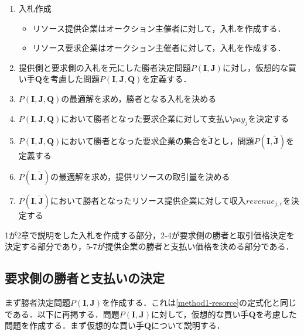 \begin{enumerate}
\def\labelenumi{\arabic{enumi}.}
\tightlist
\item
  入札作成

  \begin{itemize}
  \tightlist
  \item
    リソース提供企業はオークション主催者に対して，入札を作成する．
  \item
    リソース要求企業はオークション主催者に対して，入札を作成する．
  \end{itemize}
\item
  提供側と要求側の入札を元にした勝者決定問題\(P(\boldsymbol{I},\boldsymbol{J})\)に対し，仮想的な買い手\(\boldsymbol{Q}\)を考慮した問題\(P(\boldsymbol{I},\boldsymbol{J},\boldsymbol{Q})\)を定義する．
\item
  \(P(\boldsymbol{I},\boldsymbol{J},\boldsymbol{Q})\)の最適解を求め，勝者となる入札を決める
\item
  \(P(\boldsymbol{I},\boldsymbol{J},\boldsymbol{Q})\)において勝者となった要求企業に対して支払い\(pay_j\)を決定する
\item
  \(P(\boldsymbol{I},\boldsymbol{J},\boldsymbol{Q})\)において勝者となった要求企業の集合を\(\boldsymbol{\tilde{J}}\)とし，問題\(P(\boldsymbol{I},\boldsymbol{\tilde{J}})\)を定義する
\item
  \(P(\boldsymbol{I},\boldsymbol{\tilde{J}})\)の最適解を求め，提供リソースの取引量を決める
\item
  \(P(\boldsymbol{I},\boldsymbol{\tilde{J}})\)において勝者となったリソース提供企業に対して収入\(revenue_{j,r}\)を決定する
\end{enumerate}

1が2章で説明をした入札を作成する部分，2-4が要求側の勝者と取引価格決定を決定する部分であり，5-7が提供企業の勝者と支払い価格を決める部分である．

\hypertarget{ux8981ux6c42ux5074ux306eux52ddux8005ux3068ux652fux6255ux3044ux306eux6c7aux5b9a}{%
\subsection{要求側の勝者と支払いの決定}\label{ux8981ux6c42ux5074ux306eux52ddux8005ux3068ux652fux6255ux3044ux306eux6c7aux5b9a}}

まず勝者決定問題\(P(\boldsymbol{I},\boldsymbol{J})\)を作成する．これは\ref{method1-resorce}の定式化と同じである．以下に再掲する．問題\(P(\boldsymbol{I},\boldsymbol{J})\)に対して，仮想的な買い手\(\boldsymbol{Q}\)を考慮した問題を作成する．まず仮想的な買い手\(\boldsymbol{Q}\)について説明する．

